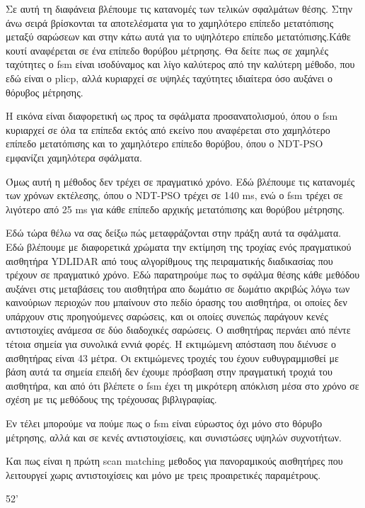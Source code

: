 \documentclass[a4paper,10pt]{article}
\begin{document}
Σε αυτή τη διαφάνεια βλέπουμε τις κατανομές των τελικών σφαλμάτων θέσης. Στην
άνω σειρά βρίσκονται τα αποτελέσματα για το χαμηλότερο επίπεδο μετατόπισης
μεταξύ σαρώσεων και στην κάτω αυτά για το υψηλότερο επίπεδο μετατόπισης.Κάθε
κουτί αναφέρεται σε ένα επίπεδο θορύβου μέτρησης. Θα δείτε πως σε χαμηλές
ταχύτητες ο fsm είναι ισοδύναμος και λίγο καλύτερος από την καλύτερη μέθοδο,
που εδώ είναι ο plicp, αλλά κυριαρχεί σε υψηλές ταχύτητες ιδιαίτερα όσο αυξάνει
ο θόρυβος μέτρησης.

Η εικόνα είναι διαφορετική ως προς τα σφάλματα προσανατολισμού, όπου ο fsm
κυριαρχεί σε όλα τα επίπεδα εκτός από εκείνο που αναφέρεται στο χαμηλότερο
επίπεδο μετατόπισης και το χαμηλότερο επίπεδο θορύβου, όπου ο NDT-PSO εμφανίζει
χαμηλότερα σφάλματα.

Όμως αυτή η μέθοδος δεν τρέχει σε πραγματικό χρόνο. Εδώ βλέπουμε τις κατανομές
των χρόνων εκτέλεσης, όπου ο NDT-PSO τρέχει σε 140 ms, ενώ ο fsm τρέχει σε
λιγότερο από 25 ms για κάθε επίπεδο αρχικής μετατόπισης και θορύβου μέτρησης.

Εδώ τώρα θέλω να σας δείξω πώς μεταφράζονται στην πράξη αυτά τα σφάλματα. Εδώ
βλέπουμε με διαφορετικά χρώματα την εκτίμηση της τροχίας ενός πραγματικού
αισθητήρα YDLIDAR από τους αλγορίθμους της πειραματικής διαδικασίας που τρέχουν
σε πραγματικό χρόνο. Εδώ παρατηρούμε πως το σφάλμα θέσης κάθε μεθόδου αυξάνει
στις μεταβάσεις του αισθητήρα απο δωμάτιο σε δωμάτιο ακριβώς λόγω των
καινούριων περιοχών που μπαίνουν στο πεδίο όρασης του αισθητήρα, οι οποίες δεν
υπάρχουν στις προηγούμενες σαρώσεις, και οι οποίες συνεπώς παράγουν κενές
αντιστοιχίες ανάμεσα σε δύο διαδοχικές σαρώσεις.  Ο αισθητήρας περνάει από
πέντε τέτοια σημεία για συνολικά εννιά φορές. Η εκτιμώμενη απόσταση που διένυσε
ο αισθητήρας είναι 43 μέτρα. Οι εκτιμώμενες τροχιές του έχουν ευθυγραμμισθεί με
βάση αυτά τα σημεία επειδή δεν έχουμε πρόσβαση στην πραγματική τροχιά του
αισθητήρα, και από ότι βλέπετε ο fsm έχει τη μικρότερη απόκλιση μέσα στο χρόνο
σε σχέση με τις μεθόδους της τρέχουσας βιβλιγραφίας.

Εν τέλει μπορούμε να πούμε πως ο fsm είναι εύρωστος όχι μόνο στο θόρυβο
μέτρησης, αλλά και σε κενές αντιστοιχίσεις, και συνιστώσες υψηλών συχνοτήτων.

Και πως είναι η πρώτη scan matching μεθοδος για πανοραμικούς αισθητήρες
που λειτουργεί χωρις αντιστοιχίσεις και μόνο με τρεις προαιρετικές παραμέτρους.


52'
\end{document}
